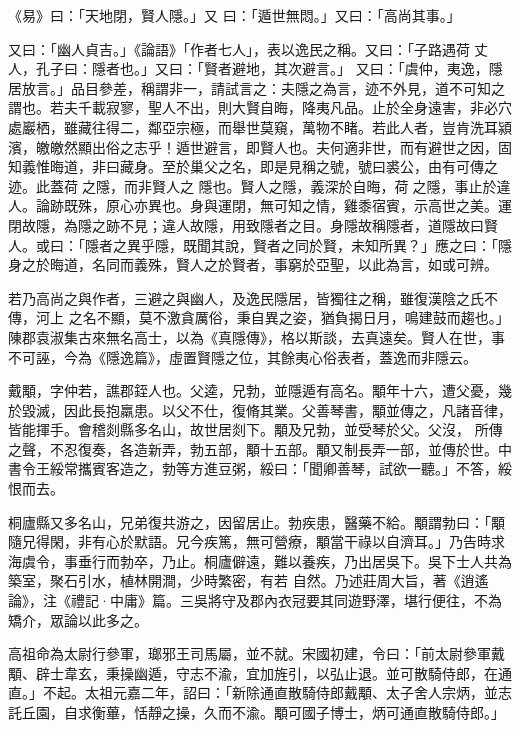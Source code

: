 
\begin{pinyinscope}

 《易》曰：「天地閉，賢人隱。」又
 曰：「遁世無悶。」又曰：「高尚其事。」



 又曰：「幽人貞吉。」《論語》「作者七人」，表以逸民之稱。又曰：「子路遇荷丈人，孔子曰：隱者也。」又曰：「賢者避地，其次避言。」
 又曰：「虞仲，夷逸，隱居放言。」品目參差，稱謂非一，請試言之：夫隱之為言，迹不外見，道不可知之謂也。若夫千載寂寥，聖人不出，則大賢自晦，降夷凡品。止於全身遠害，非必穴處巖栖，雖藏往得二，鄰亞宗極，而舉世莫窺，萬物不睹。若此人者，豈肯洗耳潁濱，皦皦然顯出俗之志乎！遁世避言，即賢人也。夫何適非世，而有避世之因，固知義惟晦道，非曰藏身。至於巢父之名，即是見稱之號，號曰裘公，由有可傳之迹。此蓋荷之隱，而非賢人之
 隱也。賢人之隱，義深於自晦，荷之隱，事止於違人。論跡既殊，原心亦異也。身與運閉，無可知之情，雞黍宿賓，示高世之美。運閉故隱，為隱之跡不見；違人故隱，用致隱者之目。身隱故稱隱者，道隱故曰賢人。或曰：「隱者之異乎隱，既聞其說，賢者之同於賢，未知所異？」應之曰：「隱身之於晦道，名同而義殊，賢人之於賢者，事窮於亞聖，以此為言，如或可辨。



 若乃高尚之與作者，三避之與幽人，及逸民隱居，皆獨往之稱，雖復漢陰之氏不傳，河上
 之名不顯，莫不激貪厲俗，秉自異之姿，猶負揭日月，鳴建鼓而趨也。」陳郡袁淑集古來無名高士，以為《真隱傳》，格以斯談，去真遠矣。賢人在世，事不可誣，今為《隱逸篇》，虛置賢隱之位，其餘夷心俗表者，蓋逸而非隱云。



 戴顒，字仲若，譙郡銍人也。父逵，兄勃，並隱遁有高名。顒年十六，遭父憂，幾於毀滅，因此長抱羸患。以父不仕，復脩其業。父善琴書，顒並傳之，凡諸音律，皆能揮手。會稽剡縣多名山，故世居剡下。顒及兄勃，並受琴於父。父沒，
 所傳之聲，不忍復奏，各造新弄，勃五部，顒十五部。顒又制長弄一部，並傳於世。中書令王綏常攜賓客造之，勃等方進豆粥，綏曰：「聞卿善琴，試欲一聽。」不答，綏恨而去。



 桐廬縣又多名山，兄弟復共游之，因留居止。勃疾患，醫藥不給。顒謂勃曰：「顒隨兄得閑，非有心於默語。兄今疾篤，無可營療，顒當干祿以自濟耳。」乃告時求海虞令，事垂行而勃卒，乃止。桐廬僻遠，難以養疾，乃出居吳下。吳下士人共為築室，聚石引水，植林開澗，少時繁密，有若
 自然。乃述莊周大旨，著《逍遙論》，注《禮記·中庸》篇。三吳將守及郡內衣冠要其同遊野澤，堪行便往，不為矯介，眾論以此多之。



 高祖命為太尉行參軍，瑯邪王司馬屬，並不就。宋國初建，令曰：「前太尉參軍戴顒、辟士韋玄，秉操幽遁，守志不渝，宜加旌引，以弘止退。並可散騎侍郎，在通直。」不起。太祖元嘉二年，詔曰：「新除通直散騎侍郎戴顒、太子舍人宗炳，並志託丘園，自求衡蓽，恬靜之操，久而不渝。顒可國子博士，炳可通直散騎侍郎。」




\end{pinyinscope}
